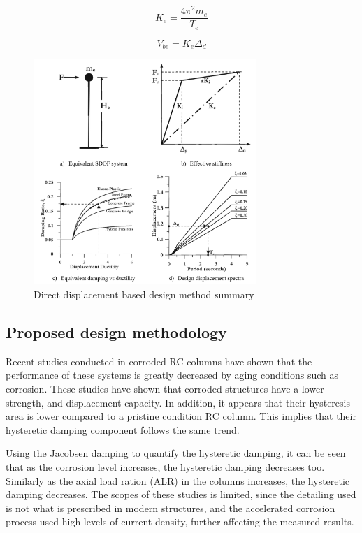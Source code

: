 \begin{equation}
    K_e=\frac{4\pi^{2}m_{e}}{T_{e}}
    \label{eq:EffectiveStiffness}
\end{equation}

\begin{equation}
    V_{be}=K_{e}\Delta_{d}
    \label{eq:BaseShearDDBD}
\end{equation}

\begin{figure}[htbp]
	\centering
	\includegraphics[width=0.75\textwidth]{VAC Prelim 2.0/Chapter-5/figs/DDBD.png}
	\caption{Direct displacement based design method summary \cite{Priestley2007}}
	\label{fig:DDBD_sum}
\end{figure}
\subsection{Proposed design methodology}

Recent studies conducted in corroded RC columns have shown that the performance of these systems is greatly decreased by aging conditions such as corrosion. These studies have shown that corroded structures have a lower strength, and displacement capacity. In addition, it appears that their hysteresis area is lower compared to a pristine condition RC column. This implies that their hysteretic damping component follows the same trend. 

Using the Jacobsen damping to quantify the hysteretic damping, it can be seen that as the corrosion level increases, the hysteretic damping decreases too. Similarly as the axial load ration (ALR) in the columns increases, the hysteretic damping decreases. The scopes of these studies is limited, since the detailing used is not what is prescribed in modern structures, and the accelerated corrosion process used high levels of current density, further affecting the measured results. 

